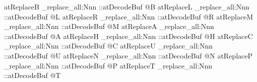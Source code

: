 %
%
\edef\pedia:atReplaceB{ \noexpand\tl_replace_all:Nnn \noexpand\pedia:atDecodeBuf { @B } { \pediaAtDecodedB } }
\edef\pedia:atReplaceL{ \noexpand\tl_replace_all:Nnn \noexpand\pedia:atDecodeBuf { @L } { \pediaAtDecodedL } }
\edef\pedia:atReplaceR{ \noexpand\tl_replace_all:Nnn \noexpand\pedia:atDecodeBuf { @R } { \pediaAtDecodedR } }
\edef\pedia:atReplaceM{ \noexpand\tl_replace_all:Nnn \noexpand\pedia:atDecodeBuf { @M } { \pediaAtDecodedM } }
\edef\pedia:atReplaceA{ \noexpand\tl_replace_all:Nnn \noexpand\pedia:atDecodeBuf { @A } { \pediaAtDecodedA } }
\edef\pedia:atReplaceH{ \noexpand\tl_replace_all:Nnn \noexpand\pedia:atDecodeBuf { @H } { \pediaAtDecodedH } }
\edef\pedia:atReplaceC{ \noexpand\tl_replace_all:Nnn \noexpand\pedia:atDecodeBuf { @C } { \pediaAtDecodedC } }
\edef\pedia:atReplaceU{ \noexpand\tl_replace_all:Nnn \noexpand\pedia:atDecodeBuf { @U } { \pediaAtDecodedU } }
\edef\pedia:atReplaceN{ \noexpand\tl_replace_all:Nnn \noexpand\pedia:atDecodeBuf { @N } { \pediaAtDecodedN } }
\edef\pedia:atReplaceP{ \noexpand\tl_replace_all:Nnn \noexpand\pedia:atDecodeBuf { @P } { \pediaAtDecodedP } }
\edef\pedia:atReplaceT{ \noexpand\tl_replace_all:Nnn \noexpand\pedia:atDecodeBuf { @T } { \pediaAtDecodedT } }

\def\pediaAtDecodeVar#1{
  \tl_set:NV \pedia:atDecodeBuf #1
  \tl_replace_all:Nnn \pedia:atDecodeBuf { @@ } { \tmpat }
  \pedia:atReplaceB
  \pedia:atReplaceL
  \pedia:atReplaceR
  \pedia:atReplaceM
  \pedia:atReplaceA
  \pedia:atReplaceH
  \pedia:atReplaceC
  \pedia:atReplaceU
  \pedia:atReplaceN
  \pedia:atReplaceP
  \pedia:atReplaceT
  \tl_replace_all:Nnn \pedia:atDecodeBuf { \tmpat } { @ }
}

\def\pediaAtDecodeResult{
  \tl_use:N \pedia:atDecodeBuf
}

\ExplSyntaxOff
